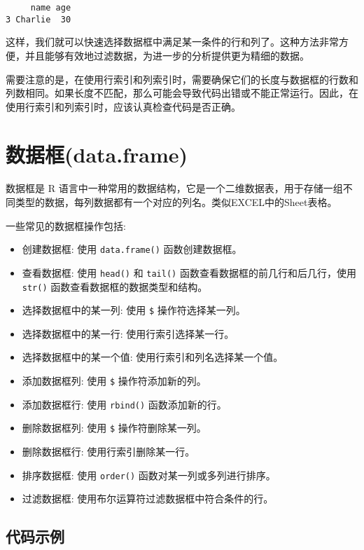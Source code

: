 \documentclass[
  letterpaper,
  DIV=11,
  numbers=noendperiod]{scrreprt}
\providecommand{\tightlist}{%
  \setlength{\itemsep}{0pt}\setlength{\parskip}{0pt}}\usepackage{longtable,booktabs,array}
\begin{document}
\begin{verbatim}
     name age
3 Charlie  30
\end{verbatim}

这样，我们就可以快速选择数据框中满足某一条件的行和列了。这种方法非常方便，并且能够有效地过滤数据，为进一步的分析提供更为精细的数据。

需要注意的是，在使用行索引和列索引时，需要确保它们的长度与数据框的行数和列数相同。如果长度不匹配，那么可能会导致代码出错或不能正常运行。因此，在使用行索引和列索引时，应该认真检查代码是否正确。

\chapter{数据框(data.frame)}\label{ux6570ux636eux6846data.frame}

数据框是 R
语言中一种常用的数据结构，它是一个二维数据表，用于存储一组不同类型的数据，每列数据都有一个对应的列名。类似EXCEL中的Sheet表格。

一些常见的数据框操作包括:

\begin{itemize}
\tightlist
\item
  创建数据框: 使用 \texttt{data.frame()} 函数创建数据框。
\item
  查看数据框: 使用 \texttt{head()} 和 \texttt{tail()}
  函数查看数据框的前几行和后几行，使用 \texttt{str()}
  函数查看数据框的数据类型和结构。
\item
  选择数据框中的某一列: 使用 \texttt{\$} 操作符选择某一列。
\item
  选择数据框中的某一行: 使用行索引选择某一行。
\item
  选择数据框中的某一个值: 使用行索引和列名选择某一个值。
\item
  添加数据框列: 使用 \texttt{\$} 操作符添加新的列。
\item
  添加数据框行: 使用 \texttt{rbind()} 函数添加新的行。
\item
  删除数据框列: 使用 \texttt{\$} 操作符删除某一列。
\item
  删除数据框行: 使用行索引删除某一行。
\item
  排序数据框: 使用 \texttt{order()} 函数对某一列或多列进行排序。
\item
  过滤数据框: 使用布尔运算符过滤数据框中符合条件的行。
\end{itemize}

\section{代码示例}\label{ux4ee3ux7801ux793aux4f8b-1}
\end{document}
